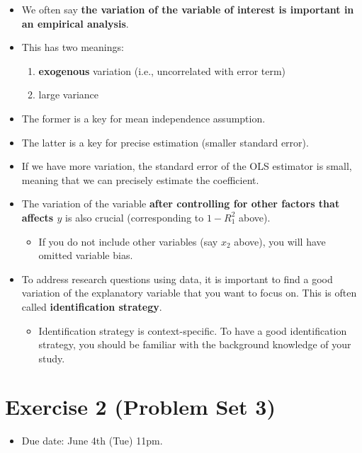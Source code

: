 \documentclass[]{book}
\providecommand{\tightlist}{%
  \setlength{\itemsep}{0pt}\setlength{\parskip}{0pt}}
\begin{document}
\begin{itemize}
\item
  We often say \textbf{the variation of the variable of interest is
  important in an empirical analysis}.
\item
  This has two meanings:

  \begin{enumerate}
  \def\labelenumi{\arabic{enumi}.}
  \tightlist
  \item
    \textbf{exogenous} variation (i.e., uncorrelated with error term)
  \item
    large variance
  \end{enumerate}
\item
  The former is a key for mean independence assumption.
\item
  The latter is a key for precise estimation (smaller standard error).
\item
  If we have more variation, the standard error of the OLS estimator is
  small, meaning that we can precisely estimate the coefficient.
\item
  The variation of the variable \textbf{after controlling for other
  factors that affects \(y\)} is also crucial (corresponding to
  \(1-R_1^2\) above).

  \begin{itemize}
  \tightlist
  \item
    If you do not include other variables (say \(x_2\) above), you will
    have omitted variable bias.
  \end{itemize}
\item
  To address research questions using data, it is important to find a
  good variation of the explanatory variable that you want to focus on.
  This is often called \textbf{identification strategy}.

  \begin{itemize}
  \tightlist
  \item
    Identification strategy is context-specific. To have a good
    identification strategy, you should be familiar with the background
    knowledge of your study.
  \end{itemize}
\end{itemize}

\chapter{Exercise 2 (Problem Set 3)}\label{exercise-2-problem-set-3}

\begin{itemize}
\tightlist
\item
  Due date: June 4th (Tue) 11pm.
\end{itemize}
\end{document}
